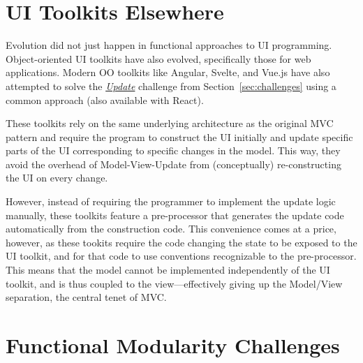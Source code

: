\documentclass[sigplan,review,screen]{acmart}
\begin{document}
\section{UI Toolkits Elsewhere}
\label{sec:ui-toolkits-elsewhere}

Evolution did not just happen in functional approaches to UI
programming.  Object-oriented UI toolkits have also evolved,
specifically those for web applications.  Modern OO toolkits like
Angular, Svelte, and Vue.js have also attempted to solve the \hyperlink{challenge:update}{\textit{Update}} challenge
from Section~\ref{sec:challenges} using a common approach (also
available with React).

These toolkits rely on the same underlying architecture as the
original MVC pattern and require the program to construct the UI
initially and update specific parts of the UI corresponding to
specific changes in the model.  This way, they avoid the overhead of
Model-View-Update from (conceptually) re-constructing the UI on every
change.

However, instead of requiring the programmer to implement the update
logic manually, these toolkits feature a pre-processor 
that generates the update code automatically from the construction code.
This convenience comes at a price, however, as these tookits require
the code changing the state to be exposed to the UI toolkit, and for
that code to use conventions recognizable to the pre-processor.  This
means that the model cannot be implemented independently of the UI
toolkit, and is thus coupled to the view---effectively giving up the
Model/View separation, the central tenet of MVC.

\section{Functional Modularity Challenges}
\label{sec:modularity-challenges}
\end{document}
